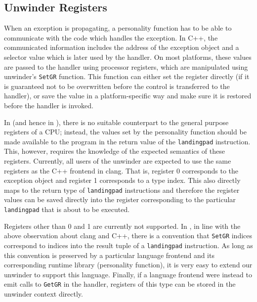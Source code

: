\subsection{Unwinder Registers}\label{unwinder-registers}

When an exception is propagating, a personality function has to be able
to communicate with the code which handles the exception. In C++, the
communicated information includes the address of the exception object
and a selector value which is later used by the handler. On most
platforms, these values are passed to the handler using processor registers, which
are manipulated using unwinder's \texttt{SetGR} function. This function
can either set the register directly (if it is guaranteed not to be
overwritten before the control is transferred to the handler), or save
the value in a platform-specific way and make sure it is restored before
the handler is invoked.

In \llvm{} (and hence in \divm{}), there is no suitable counterpart to the
general purpose registers of a CPU; instead, the values set by the
personality function should be made available to the program in the
return value of the \texttt{landingpad} instruction. This, however,
requires the knowledge of the expected semantics of these registers.
Currently, all users of the unwinder are expected to use the same
registers as the C++ frontend in clang. That is, register 0 corresponds
to the exception object and register 1 corresponds to a type index. This
also directly maps to the return type of \texttt{landingpad}
instructions and therefore the register values can be saved directly
into the \llvm{} register corresponding to the particular
\texttt{landingpad} that is about to be executed.

Registers other than 0 and 1 are currently not supported. In \llvm{}, in
line with the above observation about clang and C++, there is a
convention that \texttt{SetGR} indices correspond to indices into the
result tuple of a \texttt{landingpad} instruction. As long as this
convention is preserved by a particular language frontend and its
corresponding runtime library (personality function), it is very easy to
extend our unwinder to support this language. Finally, if a language
frontend were instead to emit calls to \texttt{GetGR} in the handler,
registers of this type can be stored in the unwinder context directly.

